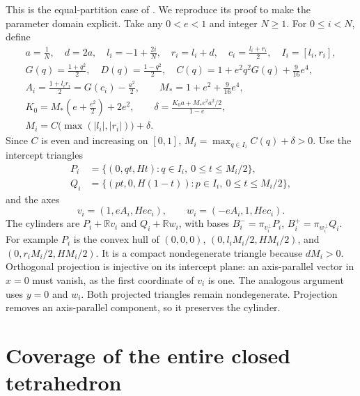 \documentclass[11pt]{article}
\newcommand{\R}{\mathbb R}
\newcommand{\Mstar}{M_*}
\begin{document}
This is the equal-partition case of \cite[Sections 1--3]{vdk-secant}.
We reproduce its proof to make the parameter domain explicit.
Take any \(0<e<1\) and integer \(N\ge1\). For \(0\le i<N\), define
\begin{gather}
 a=\frac1N,\quad d=2a,\quad l_i=-1+\frac{2i}{N},\quad
 r_i=l_i+d,\quad c_i=\frac{l_i+r_i}{2},\quad I_i=[l_i,r_i],\label{eq:grid}\\
 G(q)=\frac{1+q^2}{2},\quad D(q)=\frac{1-q^2}{2},\quad
 C(q)=1+e^2q^2G(q)+\frac9{16}e^4,\label{eq:cap}\\
 A_i=\frac{1+l_i r_i}{2}=G(c_i)-\frac{a^2}{2},\qquad
 \Mstar=1+e^2+\frac9{16}e^4,\\
 K_0=\Mstar\left(e+\frac{e^2}{2}\right)+2e^2,\qquad
 \delta=\frac{K_0a+\Mstar e^2a^2/2}{1-e},\label{eq:padding}\\
 M_i=C\bigl(\max(|l_i|,|r_i|)\bigr)+\delta.\label{eq:Mi}
\end{gather}
Since \(C\) is even and increasing on \([0,1]\),
\(M_i=\max_{q\in I_i}C(q)+\delta>0\).
Use the intercept triangles
\begin{align}
 P_i&=\{(0,qt,Ht):q\in I_i,\ 0\le t\le M_i/2\},\\
 Q_i&=\{(pt,0,H(1-t)):p\in I_i,\ 0\le t\le M_i/2\},
\end{align}
and the axes
\begin{equation}\label{eq:axes}
 v_i=(1,eA_i,Hec_i),\qquad w_i=(-eA_i,1,Hec_i).
\end{equation}
The cylinders are \(P_i+\R v_i\) and \(Q_i+\R w_i\), with bases
\(B_i^-=\pi_{v_i^\perp}P_i\), \(B_i^+=\pi_{w_i^\perp}Q_i\).
For example \(P_i\) is the convex hull of
\((0,0,0)\), \((0,l_iM_i/2,HM_i/2)\), and
\((0,r_iM_i/2,HM_i/2)\).
It is a compact nondegenerate triangle because \(dM_i>0\).
Orthogonal projection is injective on its intercept plane:
an axis-parallel vector in \(x=0\) must vanish, as the first coordinate
of \(v_i\) is one. The analogous argument uses \(y=0\) and \(w_i\).
Both projected triangles remain nondegenerate.
Projection removes an axis-parallel component, so it preserves the cylinder.

\section{Coverage of the entire closed tetrahedron}
\end{document}
